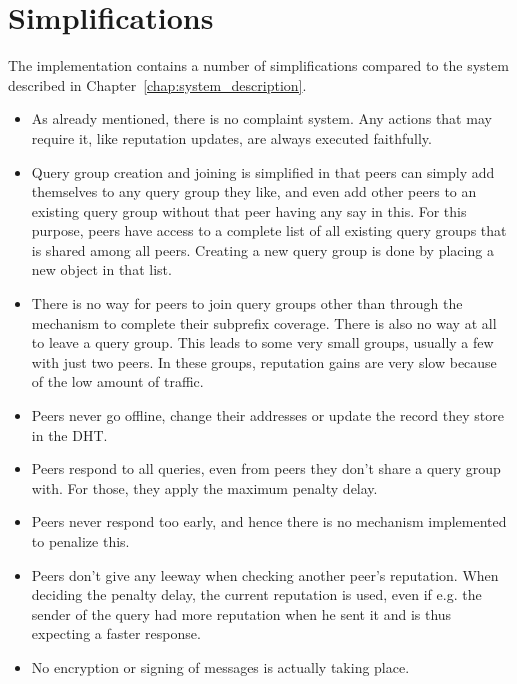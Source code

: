 \section{Simplifications}
The implementation contains a number of simplifications compared to the system
described in Chapter~\ref{chap:system_description}.

\begin{itemize}
\item As already mentioned, there is no complaint system. Any actions that may
require it, like reputation updates, are always executed faithfully.

\item Query group creation and joining is simplified in that peers can simply
add themselves to any query group they like, and even add other peers to an
existing query group without that peer having any say in this. For this purpose,
peers have access to a complete list of all existing query groups that is shared
among all peers. Creating a new query group is done by placing a new object in
that list.

\item There is no way for peers to join query groups other than through the
mechanism to complete their subprefix coverage. There is also no way at all to
leave a query group. This leads to some very small groups, usually a few with
just two peers. In these groups, reputation gains are very slow because of the
low amount of traffic.

\item Peers never go offline, change their addresses or update the record they
store in the \ac{DHT}.

\item Peers respond to all queries, even from peers they don't share a query
group with. For those, they apply the maximum penalty delay.

\item Peers never respond too early, and hence there is no mechanism implemented
to penalize this.

\item Peers don't give any leeway when checking another peer's reputation. When
deciding the penalty delay, the current reputation is used, even if e.g. the
sender of the query had more reputation when he sent it and is thus expecting a
faster response.

\item No encryption or signing of messages is actually taking place.
\end{itemize}

